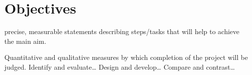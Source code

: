 \chapter{Objectives}
precise, measurable statements describing steps/tasks that will help to achieve the main aim.

Quantitative and qualitative measures by which completion of the project will be judged.
Identify and evaluate…
Design and develop…
Compare and contrast…
